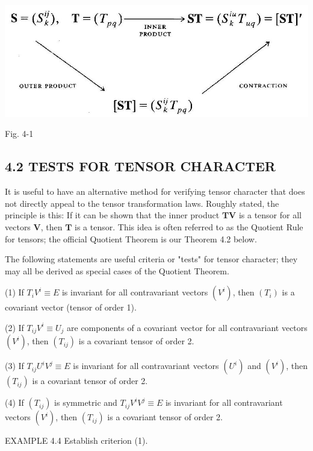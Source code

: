 \documentclass[10pt]{article}
\begin{document}
\begin{center}
\includegraphics[max width=\textwidth]{2024_04_03_41f90be4f896e21f0dc9g-053}
\end{center}

Fig. 4-1

\subsection*{4.2 TESTS FOR TENSOR CHARACTER}
It is useful to have an alternative method for verifying tensor character that does not directly appeal to the tensor transformation laws. Roughly stated, the principle is this: If it can be shown that the inner product $\mathbf{T V}$ is a tensor for all vectors $\mathbf{V}$, then $\mathbf{T}$ is a tensor. This idea is often referred to as the Quotient Rule for tensors; the official Quotient Theorem is our Theorem 4.2 below.

The following statements are useful criteria or "tests" for tensor character; they may all be derived as special cases of the Quotient Theorem.

(1) If $T_{i} V^{i} \equiv E$ is invariant for all contravariant vectors $\left(V^{i}\right)$, then $\left(T_{i}\right)$ is a covariant vector (tensor of order 1).

(2) If $T_{i j} V^{i} \equiv U_{j}$ are components of a covariant vector for all contravariant vectors $\left(V^{i}\right)$, then $\left(T_{i j}\right)$ is a covariant tensor of order 2.

(3) If $T_{i j} U^{i} V^{j} \equiv E$ is invariant for all contravariant vectors $\left(U^{i}\right)$ and $\left(V^{i}\right)$, then $\left(T_{i j}\right)$ is a covariant tensor of order 2.

(4) If $\left(T_{i j}\right)$ is symmetric and $T_{i j} V^{i} V^{j} \equiv E$ is invariant for all contravariant vectors $\left(V^{i}\right)$, then $\left(T_{i j}\right)$ is a covariant tensor of order 2.

EXAMPLE 4.4 Establish criterion (1).
\end{document}
